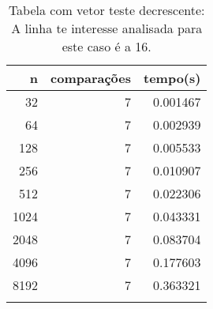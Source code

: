 \begin{table}[ht]
\centering
\begin{tabular}{rrr} \toprule
        n &    comparações &       tempo(s) \\ \midrule
      32  &              7 &      0.001467 \\
      64  &              7 &      0.002939 \\
     128  &              7 &      0.005533 \\
     256  &              7 &      0.010907 \\
     512  &              7 &      0.022306 \\
    1024  &              7 &      0.043331 \\
    2048  &              7 &      0.083704 \\
    4096  &              7 &      0.177603 \\
    8192  &              7 &      0.363321 \\
\bottomrule\addlinespace
\end{tabular}
\caption{Tabela com vetor teste decrescente: A linha te interesse analisada para este caso é a 16.}
\label{tab:radixsortDecrescente}
\end{table}
